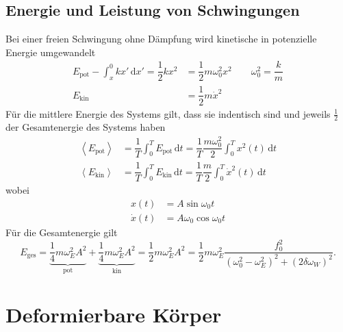 \documentclass[a4paper,12pt]{article}
\newcommand{\td}{\,\text{d}}
\numberwithin{equation}{section}
\begin{document}
\subsection{Energie und Leistung von Schwingungen}
Bei einer freien Schwingung ohne Dämpfung wird kinetische in potenzielle Energie umgewandelt
\begin{align*}
        E_{\text{pot}}-\int_{x}^{0}kx'\td x'=\dfrac{1}{2}kx^2&=\dfrac{1}{2}m\omega _0^2x^2\qquad \omega _0^2=\dfrac{k}{m}\\
        E_{\text{kin}}&=\dfrac{1}{2}m\dot{x}^2
\end{align*}
Für die mittlere Energie des Systems gilt, dass sie indentisch sind und jeweils $\tfrac{1}{2}$ der Gesamtenergie des Systems haben
\begin{align*}
        \left\langle E_{\text{pot}}\right\rangle &=\dfrac{1}{T}\int_{0}^{T}E_{\text{pot}}\td t=\dfrac{1}{T}\dfrac{m\omega _0^2}{2}\int_{0}^{T}x^2\left(t\right)\td t\\
        \left\langle E_{\text{kin}}\right\rangle &=\dfrac{1}{T}\int_{0}^{T}E_{\text{kin}}\td t=\dfrac{1}{T}\dfrac{m}{2}\int_{0}^{T}\dot{x}^2\left(t\right)\td t
\end{align*}
wobei
\begin{align*}
        x\left(t\right)&=A\sin \omega _0t\\
        \dot{x}\left(t\right)&=A\omega _0\cos \omega _0t
\end{align*}
Für die Gesamtenergie gilt
\[ 
        E_{\text{ges}}=\underbrace{\dfrac{1}{4}m\omega _E^2A^2}_{\text{pot}}+\underbrace{\dfrac{1}{4}m\omega _E^2A^2}_{\text{kin}}=\dfrac{1}{2}m\omega _E^2A^2=\dfrac{1}{2}m\omega _E^2\dfrac{f_0^2}{\left(\omega _0^2-\omega _E^2\right)^2+\left(2\delta \omega _W\right)^2}
.\] 

\section{Deformierbare Körper}
\end{document}
